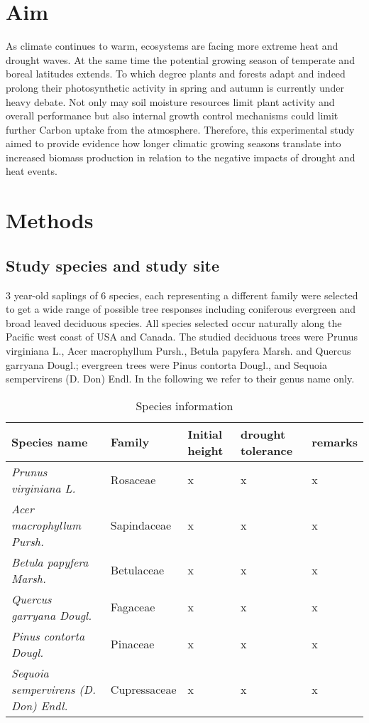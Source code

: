 \documentclass{article}
\begin{document}
	\renewcommand{\bibname}{References}%
	
	
	
	
	\date{\today}
	
	\section*{Aim}
	As climate continues to warm, ecosystems are facing more extreme heat and drought waves. At the same time the potential growing season of temperate and boreal latitudes extends. To which degree plants and forests adapt and indeed prolong their photosynthetic activity in spring and autumn is currently under heavy debate. Not only may soil moisture resources limit plant activity and overall performance but also internal growth control mechanisms could limit further Carbon uptake from the atmosphere. Therefore, this experimental study aimed to provide evidence how longer climatic growing seasons translate into increased biomass production in relation to the negative impacts of drought and heat events. 
	
	\section*{Methods}
	\subsection*{Study species and study site}
	3 year-old saplings of 6 species, each representing a different family were selected to get a wide range of possible tree responses including coniferous evergreen and broad leaved deciduous species. All species selected occur naturally along the Pacific west coast of USA and Canada. The studied deciduous trees were Prunus virginiana L., Acer macrophyllum Pursh., Betula papyfera Marsh. and Quercus garryana Dougl.; evergreen trees were Pinus contorta Dougl., and Sequoia sempervirens (D. Don) Endl. In the following we refer to their genus name only.
	
			\begin{table}[H]
		\centering
		\caption{Species information}
		\begin{tabular}{p{5.8cm} p{2cm} p{2.0cm} p{1.0cm} p{3cm}}
			\toprule
			\textbf{Species name} & \textbf{Family} & \textbf{Initial height} & \textbf{drought tolerance} & \textbf{remarks} \\
			\midrule
			\textit{Prunus virginiana L.} & Rosaceae & x & x &  x  \\
			\textit{Acer macrophyllum Pursh.} & Sapindaceae & x & x & x \\
			\textit{Betula papyfera Marsh.} & Betulaceae &x & x & x \\
			\textit{Quercus garryana Dougl.} & Fagaceae & x & x & x \\
			\textit{Pinus contorta Dougl.} & Pinaceae & x & x &  x\\
			\textit{Sequoia sempervirens (D. Don) Endl.} & Cupressaceae & x & x & x \\
			
			\bottomrule
		\end{tabular}
	\end{table}
	
\end{document}
